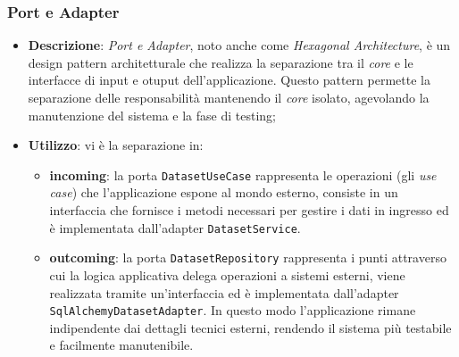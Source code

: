 \subsubsection{Port e Adapter}
\begin{itemize}
    \item \textbf{Descrizione}: \textit{Port e Adapter}, noto anche come \textit{Hexagonal Architecture}, è un design pattern architetturale 
    che realizza la separazione tra il \textit{core} e le interfacce di input e otuput dell'applicazione.
    Questo pattern permette la separazione delle responsabilità mantenendo il \textit{core} isolato, agevolando la manutenzione del sistema e la fase di testing;
    \item \textbf{Utilizzo}: vi è la separazione in:
    \begin{itemize}
        \item \textbf{incoming}: la porta \lstinline|DatasetUseCase| rappresenta le operazioni (gli \textit{use case}) che l'applicazione espone al mondo esterno, consiste in un interfaccia che fornisce i metodi necessari per gestire i dati in ingresso ed è implementata dall'adapter \lstinline|DatasetService|.
        \item \textbf{outcoming}: la porta \lstinline|DatasetRepository| rappresenta i punti attraverso cui la logica applicativa delega operazioni a sistemi esterni, viene realizzata tramite un'interfaccia ed è implementata dall'adapter \lstinline|SqlAlchemyDatasetAdapter|.
        In questo modo l’applicazione rimane indipendente dai dettagli tecnici esterni, rendendo il sistema più  testabile e facilmente manutenibile.
    \end{itemize}
\end{itemize}

